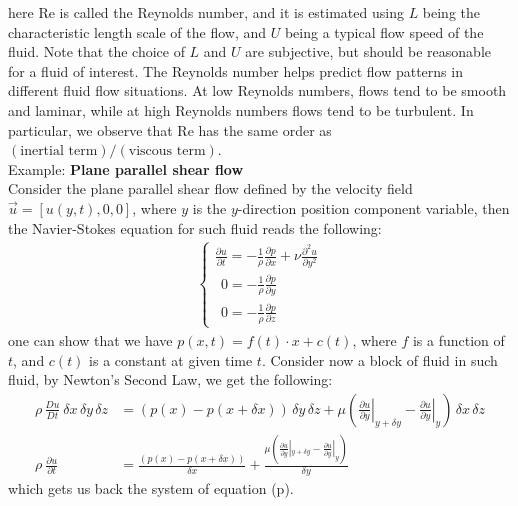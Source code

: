 \documentclass[11pt]{book}
\theoremstyle{break}
\theoremstyle{break}
\newcommand{\example}{\color{green}Example: \color{black}}
\begin{document}
here $\text{Re}$ is called the Reynolds number, and it is estimated using $L$ being the characteristic length scale of the flow, and $U$ being a typical flow speed of the fluid. Note that the choice of $L$ and $U$ are subjective, but should be reasonable for a fluid of interest. The Reynolds number helps predict flow patterns in different fluid flow situations. At low Reynolds numbers, flows tend to be smooth and laminar, while at high Reynolds numbers flows tend to be turbulent. In particular, we observe that $\text{Re}$ has the same order as $(\text{inertial term})/(\text{viscous term})$. \\



\newpage
\example \textbf{Plane parallel shear flow}\\
Consider the plane parallel shear flow defined by the velocity field $\vec{u} = [u(y,t),0,0]$, where $y$ is the $y$-direction position component variable, then the Navier-Stokes equation for such fluid reads the following:
\begin{align*}
\begin{cases}
\frac{\partial u}{\partial t} = -\frac{1}{\rho}\frac{\partial p}{\partial x} + \nu \frac{\partial^2 u}{\partial y^2}\\
\ \ 0 = -\frac{1}{\rho} \frac{\partial p}{\partial y}\\
\ \ 0 = -\frac{1}{\rho} \frac{\partial p}{\partial z} 
\end{cases} \tag{p}
\end{align*}
one can show that we have $p(x,t) = f(t) \cdot x + c(t)$, where $f$ is a function of $t$, and $c(t)$ is a constant at given time $t$. Consider now a block of fluid in such fluid, by Newton's Second Law, we get the following:
\begin{align*}
\rho\, \frac{Du}{Dt}\ \delta x \,\delta y\, \delta z &= (p(x) - p(x+\delta x)) \,\delta y\, \delta z + \mu \left(\left.\frac{\partial u}{\partial y}\right|_{y+ \delta y} - \left.\frac{\partial u}{\partial y}\right|_{y}\right)\,\delta x \, \delta z\\
\rho\ \frac{\partial u}{\partial t} &= \frac{(p(x) - p(x+\delta x))}{\delta x} + \frac{\mu \left( \frac{\partial u}{\partial y}|_{y+ \delta y} - \frac{\partial u}{\partial y}|_{y}\right)}{\delta y}
\end{align*}
which gets us back the system of equation (p). \\
\end{document}
